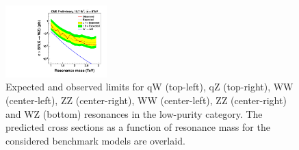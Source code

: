 \begin{figure}[h!tpb]
\begin{center}
\includegraphics[width=0.35\textwidth]{figs/limits/brazilianFlag_WZ_low_purity.pdf}
\end{center}
\caption{Expected and observed limits for qW (top-left), qZ (top-right), \GRS WW (center-left), \GRS ZZ (center-right), \GBulk WW (center-left), \GBulk ZZ (center-right) and WZ (bottom) resonances
 in the low-purity category.
  The predicted cross sections as a function of resonance mass for the considered benchmark models are overlaid.}
\label{fig:Vtagresults2}
\end{figure}

